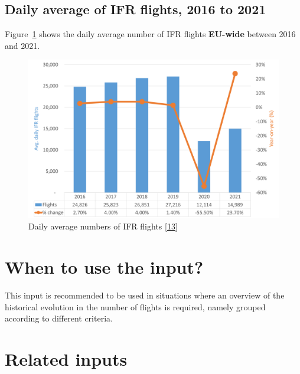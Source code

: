 \documentclass[
  11pt,
  a4paper,
]{book}
\begin{document}
\hypertarget{daily-average-of-ifr-flights-2016-to-2021}{%
\subsection{Daily average of IFR flights, 2016 to
2021}\label{daily-average-of-ifr-flights-2016-to-2021}}

Figure~\ref{fig-average-daily-ifr-flights-plot} shows the daily average
number of IFR flights \textbf{EU-wide} between 2016 and 2021.

\begin{figure}

{\centering \includegraphics{./figures/average_daily_flights.png}

}

\caption{\label{fig-average-daily-ifr-flights-plot}Daily average numbers
of IFR flights \protect\hyperlink{ref-prb:dashboard:2022}{{[}13{]}}}

\end{figure}

\hypertarget{when-to-use-the-input}{%
\section{When to use the input?}\label{when-to-use-the-input}}

This input is recommended to be used in situations where an overview of
the historical evolution in the number of flights is required, namely
grouped according to different criteria.

\hypertarget{related-inputs-2}{%
\section{Related inputs}\label{related-inputs-2}}
\end{document}
